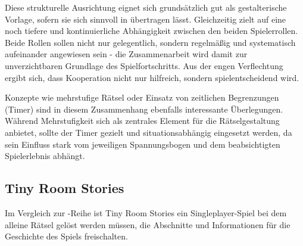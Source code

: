 Diese strukturelle Ausrichtung eignet sich grundsätzlich gut als gestalterische Vorlage, sofern sie sich sinnvoll in  übertragen lässt. Gleichzeitig zielt  auf eine noch tiefere und kontinuierliche Abhängigkeit zwischen den beiden Spielerrollen. Beide Rollen sollen nicht nur gelegentlich, sondern regelmäßig und systematisch aufeinander angewiesen sein - die Zusammenarbeit wird damit zur unverzichtbaren Grundlage des Spielfortschritts. Aus der engen Verflechtung ergibt sich, dass Kooperation nicht nur hilfreich, sondern spielentscheidend wird.

Konzepte wie mehrstufige Rätsel oder Einsatz von zeitlichen Begrenzungen (Timer) sind in diesem Zusammenhang ebenfalls interessante Überlegungen. Während Mehrstufigkeit sich als zentrales Element für die Rätselgestaltung anbietet, sollte der Timer gezielt und situationsabhängig eingesetzt werden, da sein Einfluss stark vom jeweiligen Spannungsbogen und dem beabsichtigten Spielerlebnis abhängt.

\subsection{Tiny Room Stories}
Im Vergleich zur -Reihe ist Tiny Room Stories ein Singleplayer-Spiel bei dem alleine Rätsel gelöst werden müssen, die Abschnitte und Informationen für die Geschichte des Spiels freischalten. 